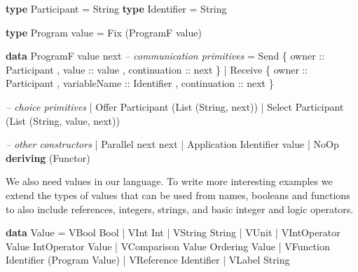 \documentclass[runningheads,plain]{llncs}
\newenvironment{Shaded}{}{}
\newcommand{\KeywordTok}[1]{\textcolor[rgb]{0.00,0.44,0.13}{\textbf{#1}}}
\newcommand{\DataTypeTok}[1]{\textcolor[rgb]{0.56,0.13,0.00}{#1}}
\newcommand{\CommentTok}[1]{\textcolor[rgb]{0.38,0.63,0.69}{\textit{#1}}}
\newcommand{\OtherTok}[1]{\textcolor[rgb]{0.00,0.44,0.13}{#1}}
\newcommand{\FunctionTok}[1]{\textcolor[rgb]{0.02,0.16,0.49}{#1}}
\newcommand{\NormalTok}[1]{#1}
\begin{document}
\begin{Shaded}
\begin{Highlighting}[]
\KeywordTok{type} \DataTypeTok{Participant} \FunctionTok{=} \DataTypeTok{String}
\KeywordTok{type} \DataTypeTok{Identifier} \FunctionTok{=} \DataTypeTok{String}

\KeywordTok{type} \DataTypeTok{Program}\NormalTok{ value }\FunctionTok{=} \DataTypeTok{Fix}\NormalTok{ (}\DataTypeTok{ProgramF}\NormalTok{ value) }

\KeywordTok{data} \DataTypeTok{ProgramF}\NormalTok{ value next }
    \CommentTok{-- communication primitives}
    \FunctionTok{=} \DataTypeTok{Send} 
\NormalTok{        \{}\OtherTok{ owner ::} \DataTypeTok{Participant}
\NormalTok{        ,}\OtherTok{ value ::}\NormalTok{ value}
\NormalTok{        ,}\OtherTok{ continuation ::}\NormalTok{ next }
\NormalTok{        \}}
    \FunctionTok{|} \DataTypeTok{Receive} 
\NormalTok{        \{}\OtherTok{ owner ::} \DataTypeTok{Participant}
\NormalTok{        ,}\OtherTok{ variableName ::} \DataTypeTok{Identifier}
\NormalTok{        ,}\OtherTok{ continuation ::}\NormalTok{ next  }
\NormalTok{        \}}

    \CommentTok{-- choice primitives}
    \FunctionTok{|} \DataTypeTok{Offer} \DataTypeTok{Participant}\NormalTok{ (}\DataTypeTok{List}\NormalTok{ (}\DataTypeTok{String}\NormalTok{, next))}
    \FunctionTok{|} \DataTypeTok{Select} \DataTypeTok{Participant}\NormalTok{ (}\DataTypeTok{List}\NormalTok{ (}\DataTypeTok{String}\NormalTok{, value, next))}

    \CommentTok{-- other constructors }
    \FunctionTok{|} \DataTypeTok{Parallel}\NormalTok{ next next }
    \FunctionTok{|} \DataTypeTok{Application} \DataTypeTok{Identifier}\NormalTok{ value}
    \FunctionTok{|} \DataTypeTok{NoOp}
    \KeywordTok{deriving}\NormalTok{ (}\DataTypeTok{Functor}\NormalTok{) }
\end{Highlighting}
\end{Shaded}

We also need values in our language. To write more interesting examples
we extend the types of values that can be used from names, booleans and
functions to also include references, integers, strings, and basic
integer and logic operators.

\begin{Shaded}
\begin{Highlighting}[]
\KeywordTok{data} \DataTypeTok{Value} 
    \FunctionTok{=} \DataTypeTok{VBool} \DataTypeTok{Bool}
    \FunctionTok{|} \DataTypeTok{VInt} \DataTypeTok{Int}
    \FunctionTok{|} \DataTypeTok{VString} \DataTypeTok{String}
    \FunctionTok{|} \DataTypeTok{VUnit}
    \FunctionTok{|} \DataTypeTok{VIntOperator} \DataTypeTok{Value} \DataTypeTok{IntOperator} \DataTypeTok{Value} 
    \FunctionTok{|} \DataTypeTok{VComparison} \DataTypeTok{Value} \DataTypeTok{Ordering} \DataTypeTok{Value}
    \FunctionTok{|} \DataTypeTok{VFunction} \DataTypeTok{Identifier}\NormalTok{ (}\DataTypeTok{Program} \DataTypeTok{Value}\NormalTok{)}
    \FunctionTok{|} \DataTypeTok{VReference} \DataTypeTok{Identifier} 
    \FunctionTok{|} \DataTypeTok{VLabel} \DataTypeTok{String}
\end{Highlighting}
\end{Shaded}
\end{document}
